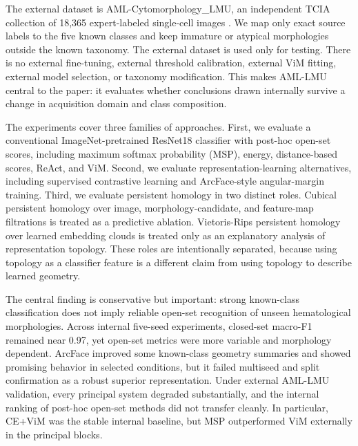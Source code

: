 The external dataset is AML-Cytomorphology\_LMU, an independent TCIA collection of 18,365 expert-labeled single-cell images \cite{aml_lmu_tcia_2019}. We map only exact source labels to the five known classes and keep immature or atypical morphologies outside the known taxonomy. The external dataset is used only for testing. There is no external fine-tuning, external threshold calibration, external ViM fitting, external model selection, or taxonomy modification. This makes AML-LMU central to the paper: it evaluates whether conclusions drawn internally survive a change in acquisition domain and class composition.

The experiments cover three families of approaches. First, we evaluate a conventional ImageNet-pretrained ResNet18 classifier with post-hoc open-set scores, including maximum softmax probability (MSP), energy, distance-based scores, ReAct, and ViM. Second, we evaluate representation-learning alternatives, including supervised contrastive learning and ArcFace-style angular-margin training. Third, we evaluate persistent homology in two distinct roles. Cubical persistent homology over image, morphology-candidate, and feature-map filtrations is treated as a predictive ablation. Vietoris-Rips persistent homology over learned embedding clouds is treated only as an explanatory analysis of representation topology. These roles are intentionally separated, because using topology as a classifier feature is a different claim from using topology to describe learned geometry.

The central finding is conservative but important: strong known-class classification does not imply reliable open-set recognition of unseen hematological morphologies. Across internal five-seed experiments, closed-set macro-F1 remained near 0.97, yet open-set metrics were more variable and morphology dependent. ArcFace improved some known-class geometry summaries and showed promising behavior in selected conditions, but it failed multiseed and split confirmation as a robust superior representation. Under external AML-LMU validation, every principal system degraded substantially, and the internal ranking of post-hoc open-set methods did not transfer cleanly. In particular, CE+ViM was the stable internal baseline, but MSP outperformed ViM externally in the principal blocks.

